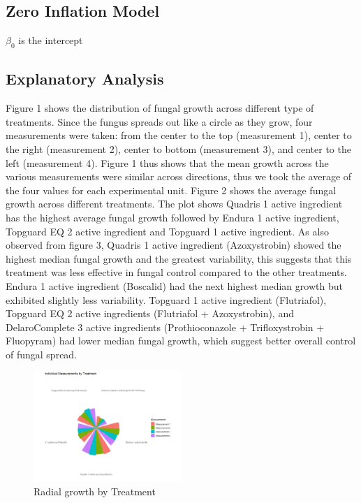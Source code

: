 \documentclass[
  10pt,
  letterpaper,
  twocolumn]{article}
\begin{document}
\subsection*{Zero Inflation Model}
$\beta_0$ is the intercept

\hypertarget{explanatory-analysis}{%
\subsection{Explanatory Analysis}\label{explanatory-analysis}}

Figure 1 shows the distribution of fungal growth across different type
of treatments. Since the fungus spreads out like a circle as they grow,
four measurements were taken: from the center to the top (measurement
1), center to the right (measurement 2), center to bottom (measurement
3), and center to the left (measurement 4). Figure 1 thus shows that the
mean growth across the various measurements were similar across
directions, thus we took the average of the four values for each
experimental unit. Figure 2 shows the average fungal growth across
different treatments. The plot shows Quadris 1 active ingredient has the
highest average fungal growth followed by Endura 1 active ingredient,
Topguard EQ 2 active ingredient and Topguard 1 active ingredient. As
also observed from figure 3, Quadris 1 active ingredient (Azoxystrobin)
showed the highest median fungal growth and the greatest variability,
this suggests that this treatment was less effective in fungal control
compared to the other treatments. Endura 1 active ingredient (Boscalid)
had the next highest median growth but exhibited slightly less
variability. Topguard 1 active ingredient (Flutriafol), Topguard EQ 2
active ingredients (Flutriafol + Azoxystrobin), and DelaroComplete 3
active ingredients (Prothioconazole + Trifloxystrobin + Fluopyram) had
lower median fungal growth, which suggest better overall control of
fungal spread.

\begin{figure}

{\centering \includegraphics[width=0.5\textwidth,height=\textheight]{Fig1.jpeg}

}

\caption{Radial growth by Treatment}

\end{figure}
\end{document}
